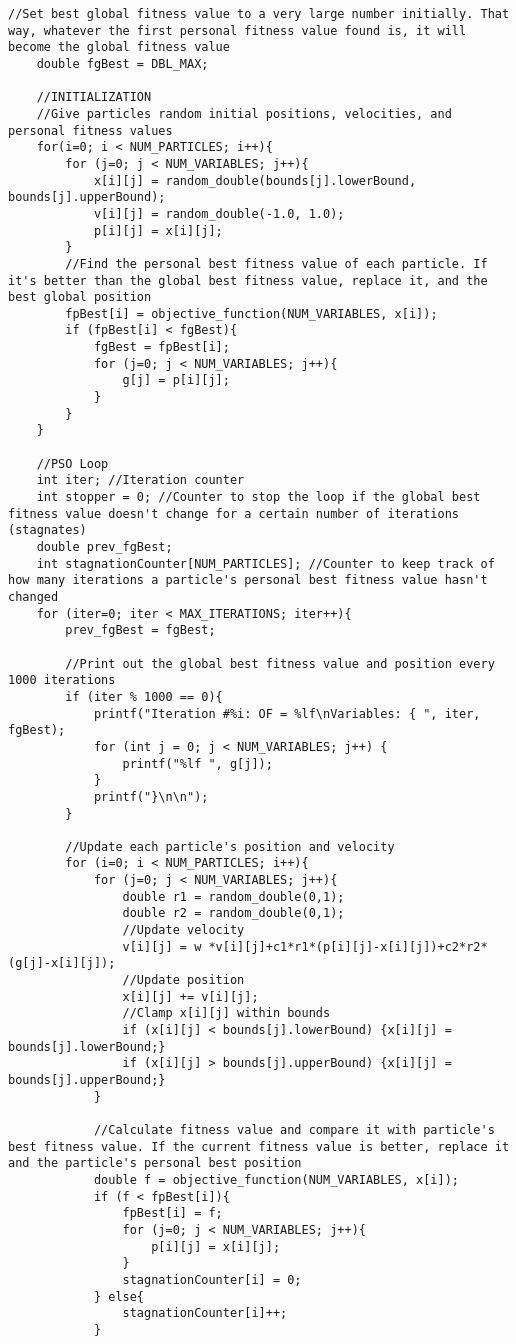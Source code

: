 \documentclass[12pt]{article}
\begin{document}
\begin{lstlisting}[basicstyle=\small]
    //Set best global fitness value to a very large number initially. That way, whatever the first personal fitness value found is, it will become the global fitness value
    double fgBest = DBL_MAX;

    //INITIALIZATION
    //Give particles random initial positions, velocities, and personal fitness values
    for(i=0; i < NUM_PARTICLES; i++){
        for (j=0; j < NUM_VARIABLES; j++){
            x[i][j] = random_double(bounds[j].lowerBound, bounds[j].upperBound);
            v[i][j] = random_double(-1.0, 1.0);
            p[i][j] = x[i][j];
        }
        //Find the personal best fitness value of each particle. If it's better than the global best fitness value, replace it, and the best global position
        fpBest[i] = objective_function(NUM_VARIABLES, x[i]);
        if (fpBest[i] < fgBest){
            fgBest = fpBest[i];
            for (j=0; j < NUM_VARIABLES; j++){
                g[j] = p[i][j];
            }
        }
    }

    //PSO Loop
    int iter; //Iteration counter
    int stopper = 0; //Counter to stop the loop if the global best fitness value doesn't change for a certain number of iterations (stagnates)
    double prev_fgBest;
    int stagnationCounter[NUM_PARTICLES]; //Counter to keep track of how many iterations a particle's personal best fitness value hasn't changed
    for (iter=0; iter < MAX_ITERATIONS; iter++){
        prev_fgBest = fgBest;

        //Print out the global best fitness value and position every 1000 iterations
        if (iter % 1000 == 0){
            printf("Iteration #%i: OF = %lf\nVariables: { ", iter, fgBest);
            for (int j = 0; j < NUM_VARIABLES; j++) {
                printf("%lf ", g[j]);
            }
            printf("}\n\n");
        }

        //Update each particle's position and velocity
        for (i=0; i < NUM_PARTICLES; i++){
            for (j=0; j < NUM_VARIABLES; j++){
                double r1 = random_double(0,1);
                double r2 = random_double(0,1);
                //Update velocity
                v[i][j] = w *v[i][j]+c1*r1*(p[i][j]-x[i][j])+c2*r2*(g[j]-x[i][j]);
                //Update position
                x[i][j] += v[i][j];
                //Clamp x[i][j] within bounds
                if (x[i][j] < bounds[j].lowerBound) {x[i][j] = bounds[j].lowerBound;}
                if (x[i][j] > bounds[j].upperBound) {x[i][j] = bounds[j].upperBound;}
            }

            //Calculate fitness value and compare it with particle's best fitness value. If the current fitness value is better, replace it and the particle's personal best position
            double f = objective_function(NUM_VARIABLES, x[i]);
            if (f < fpBest[i]){
                fpBest[i] = f;
                for (j=0; j < NUM_VARIABLES; j++){
                    p[i][j] = x[i][j];
                }
                stagnationCounter[i] = 0;
            } else{
                stagnationCounter[i]++;
            }


\end{lstlisting}
\end{document}
